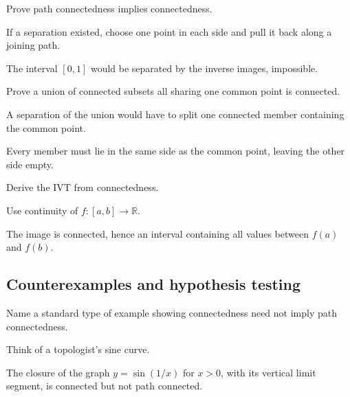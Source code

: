 \begin{exercise}\label{exr:ii07-expand-07}
Prove path connectedness implies connectedness.
\end{exercise}
\begin{hint}
If a separation existed, choose one point in each side and pull it back along a joining path.
\end{hint}
\begin{solution}
The interval \([0,1]\) would be separated by the inverse images, impossible.
\end{solution}

\begin{exercise}\label{exr:ii07-expand-08}
Prove a union of connected subsets all sharing one common point is connected.
\end{exercise}
\begin{hint}
A separation of the union would have to split one connected member containing the common point.
\end{hint}
\begin{solution}
Every member must lie in the same side as the common point, leaving the other side empty.
\end{solution}

\begin{exercise}\label{exr:ii07-expand-09}
Derive the IVT from connectedness.
\end{exercise}
\begin{hint}
Use continuity of \(f:[a,b]\to\mathbb R\).
\end{hint}
\begin{solution}
The image is connected, hence an interval containing all values between \(f(a)\) and \(f(b)\).
\end{solution}

\subsection*{Counterexamples and hypothesis testing}

\begin{exercise}\label{exr:ii07-expand-10}
Name a standard type of example showing connectedness need not imply path connectedness.
\end{exercise}
\begin{hint}
Think of a topologist's sine curve.
\end{hint}
\begin{solution}
The closure of the graph \(y=\sin(1/x)\) for \(x>0\), with its vertical limit segment, is connected but not path connected.
\end{solution}

